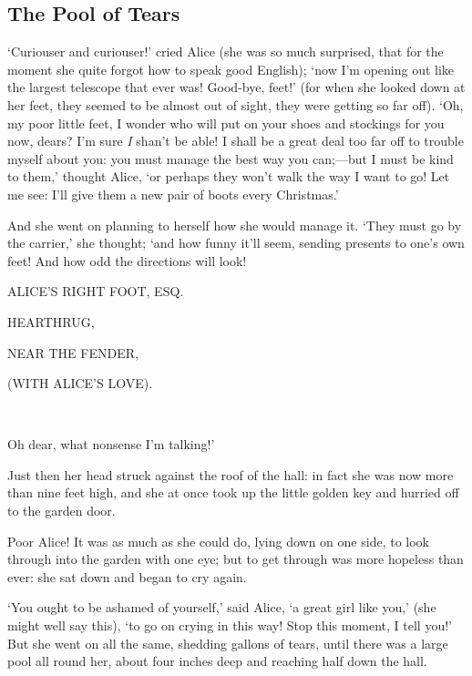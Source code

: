 \documentclass[12pt]{book}
\begin{document}
\begin{Parallel}[p]{}{}
{%
\section{The Pool of Tears}

‘Curiouser and curiouser!’ cried Alice (she was so much surprised, that for the moment she quite forgot how to speak good English); ‘now I’m opening out like the largest telescope that ever was! Good-bye, feet!’ (for when she looked down at her feet, they seemed to be almost out of sight, they were getting so far off). ‘Oh, my poor little feet, I wonder who will put on your shoes and stockings for you now, dears? I’m sure \textit{I} shan’t be able! I shall be a great deal too far off to trouble myself about you: you must manage the best way you can;—but I must be kind to them,’ thought Alice, ‘or perhaps they won’t walk the way I want to go! Let me see: I’ll give them a new pair of boots every Christmas.’

And she went on planning to herself how she would manage it. ‘They must go by the carrier,’ she thought; ‘and how funny it’ll seem, sending presents to one’s own feet! And how odd the directions will look!

{\setlength{\parskip}{0em}
\par\quad ALICE’S RIGHT FOOT, ESQ.
\par\quad\quad HEARTHRUG,
\par\quad\quad\quad NEAR THE FENDER,
\par\quad\quad\quad\quad (WITH ALICE’S LOVE).
}\\
\par

Oh dear, what nonsense I’m talking!’

Just then her head struck against the roof of the hall: in fact she was now more than nine feet high, and she at once took up the little golden key and hurried off to the garden door.

Poor Alice! It was as much as she could do, lying down on one side, to look through into the garden with one eye; but to get through was more hopeless than ever: she sat down and began to cry again.

‘You ought to be ashamed of yourself,’ said Alice, ‘a great girl like you,’ (she might well say this), ‘to go on crying in this way! Stop this moment, I tell you!’ But she went on all the same, shedding gallons of tears, until there was a large pool all round her, about four inches deep and reaching half down the hall.

}
\end{Parallel}
\end{document}

